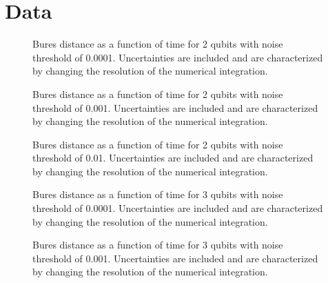 \chapter{Data}
\label{chap:data}
%





\begin{figure}
\begin{center}
\end{center}
\caption{Bures distance as a function of time for 2 qubits with noise
threshold of 0.0001.  Uncertainties are included and are characterized 
by changing the resolution of the numerical integration.}
\end{figure}

\begin{figure}
\begin{center}
\end{center}
\caption{Bures distance as a function of time for 2 qubits with noise
threshold of 0.001.  Uncertainties are included and are characterized 
by changing the resolution of the numerical integration.}
\end{figure}

\begin{figure}
\begin{center}
\end{center}
\caption{Bures distance as a function of time for 2 qubits with noise
threshold of 0.01.  Uncertainties are included and are characterized 
by changing the resolution of the numerical integration.}
\end{figure}

\begin{figure}
\begin{center}
\end{center}
\caption{Bures distance as a function of time for 3 qubits with noise
threshold of 0.0001.  Uncertainties are included and are characterized 
by changing the resolution of the numerical integration.}
\end{figure}

\begin{figure}
\begin{center}
\end{center}
\caption{Bures distance as a function of time for 3 qubits with noise
threshold of 0.001.  Uncertainties are included and are characterized 
by changing the resolution of the numerical integration.}
\end{figure}

